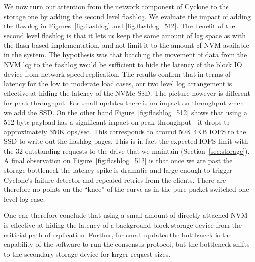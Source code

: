 \documentclass[pageno]{jpaper}
\begin{document}
We now turn our attention from the network component of Cyclone to the storage
one by adding the second level flashlog. We evaluate the impact of adding the
flashlog in Figures~\ref{fig:flashlog} and \ref{fig:flashlog_512}. The benefit
of the second level flashlog is that it lets us keep the same amount of log
space as with the flash based implementation, and not limit it to the amount of
NVM available in the system.
The hypothesis was that batching the movement of data from the
NVM log to the flashlog would be sufficient to hide the latency of the block IO
device from network speed replication. The results confirm that in terms of
latency for the low to moderate load cases, our two level log arrangement is
effective at hiding the latency of the NVMe SSD. The picture however is
different for peak throughput. For small updates there is no impact on
throughput when we add the SSD. On the other hand 
Figure~\ref{fig:flashlog_512} shows that using a 512 byte payload has a
significant impact on peak throughput - it drops to approximately 350K
ops/sec. This corresponds to around 50K 4KB IOPS to the SSD to write out the
flashlog pages. This is in fact the expected IOPS limit with the 32 outstanding
requests to the drive that we maintain (Section~\ref{sec:storage}).
A final observation on Figure~\ref{fig:flashlog_512} is that once we are past
the storage bottleneck the latency spike is dramatic and large enough to trigger
Cyclone's failure detector and repeated retries from the clients. There are
therefore no points on the ``knee'' of the curve as in the pure packet
switched one-level log case.

One can therefore conclude that using a small amount of directly attached NVM is
effective at hiding the latency of a background block storage device from the
criticial path of replication. Further, for small updates the
bottleneck is the capability of the software to run the consensus protocol, but
the bottleneck shifts to the secondary storage device for larger request sizes.
\end{document}
